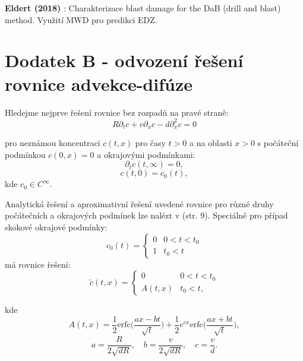 \documentclass{article}
\def\prtl{\partial}
\begin{document}
{\bf Eldert (2018)} \cite{JeroenvanEldert2018}: Charakterizace blast damage for the DaB (drill and blast) method. Využití MWD pro predikci EDZ.





\pagebreak






\section*{Dodatek B - odvození řešení rovnice advekce-difúze}
Hledejme nejprve řešení rovnice bez rozpadů na pravé straně:
\begin{equation}
    \label{eq:no_decay_ad}
    R\prtl_t c + v \prtl_x c - d \prtl^2_x c = 0
\end{equation}

pro neznámou koncentraci $c(t, x)$ pro časy $t>0$ a na oblasti $x>0$ s počáteční podmínkou $c(0, x) = 0$ a
okrajovými podmínkami:
\[
    \prtl_t c(t, \infty) = 0,
\]
\[
    c(t, 0) = c_0(t),
\]
kde $c_0 \in C^\infty$.

Analytická řešení a aproximativní řešení uvedené rovnice pro různé druhy počátečních
a okrajových podmínek lze nalézt v \cite{Genuchten1982} (str. 9). 
Speciálně pro případ skokové okrajové podmínky:
\begin{equation}
    \label{eq:jump_bc}
    c_0(t) = \left\{\begin{array}{ll}
         0 & 0 < t < t_0 \\
         1   & t_0 < t
    \end{array}\right. 
\end{equation}
má rovnice řešení:
\begin{equation}
    \label{eq:jump_sol}
    \tilde c(t, x) = 
    \left\{\begin{array}{ll}
         0                     & 0 < t < t_0 \\
         A(t,x)   & t_0 < t,
    \end{array}\right. 
\end{equation}

kde
\[
    A(t,x) = \frac12 \mathrm{erfc}\Big(\frac{ax-bt}{\sqrt t}\Big)
    + \frac12 e^{cx}\mathrm{erfc}\Big(\frac{ax+bt}{\sqrt t}\Big),
\]
\[
    a = \frac{R}{2\sqrt{dR}},\quad 
    b=\frac{v}{2\sqrt{dR}},\quad 
    c=\frac{v}{d}.
\]
\end{document}
